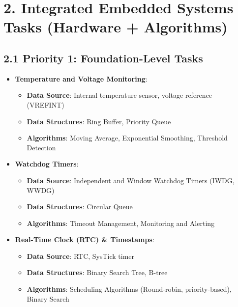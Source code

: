 \documentclass{article}
\begin{document}
\section*{2. Integrated Embedded Systems Tasks (Hardware + Algorithms)}

\subsection*{2.1 Priority 1: Foundation-Level Tasks}
\begin{itemize}
    \item \textbf{Temperature and Voltage Monitoring}:
    \begin{itemize}
        \item \textbf{Data Source}: Internal temperature sensor, voltage reference (VREFINT)
        \item \textbf{Data Structures}: Ring Buffer, Priority Queue
        \item \textbf{Algorithms}: Moving Average, Exponential Smoothing, Threshold Detection
    \end{itemize}
    
    \item \textbf{Watchdog Timers}:
    \begin{itemize}
        \item \textbf{Data Source}: Independent and Window Watchdog Timers (IWDG, WWDG)
        \item \textbf{Data Structures}: Circular Queue
        \item \textbf{Algorithms}: Timeout Management, Monitoring and Alerting
    \end{itemize}
    
    \item \textbf{Real-Time Clock (RTC) \& Timestamps}:
    \begin{itemize}
        \item \textbf{Data Source}: RTC, SysTick timer
        \item \textbf{Data Structures}: Binary Search Tree, B-tree
        \item \textbf{Algorithms}: Scheduling Algorithms (Round-robin, priority-based), Binary Search
    \end{itemize}
\end{itemize}
\end{document}

